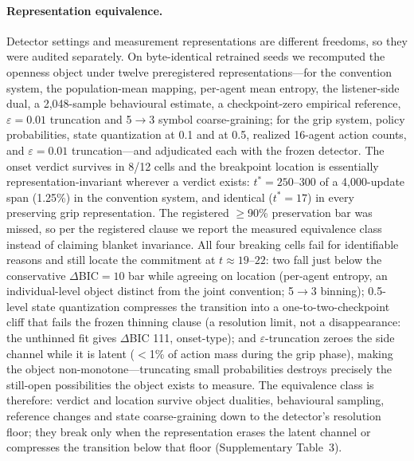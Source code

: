 \documentclass[11pt]{article}
\begin{document}
\paragraph{Representation equivalence.}
Detector settings and measurement representations are different
freedoms, so they were audited separately. On byte-identical retrained
seeds we recomputed the openness object under twelve preregistered
representations---for the convention system, the population-mean
mapping, per-agent mean entropy, the listener-side dual, a
2{,}048-sample behavioural estimate, a checkpoint-zero empirical
reference, $\varepsilon=0.01$ truncation and 5$\to$3 symbol
coarse-graining; for the grip system, policy probabilities, state
quantization at 0.1 and at 0.5, realized 16-agent action counts, and
$\varepsilon=0.01$ truncation---and adjudicated each with the frozen
detector. The onset verdict survives in 8/12 cells and the breakpoint
location is essentially representation-invariant wherever a verdict
exists: $t^{*}=250$--$300$ of a 4{,}000-update span (1.25\%) in the
convention system, and identical ($t^{*}=17$) in every preserving grip
representation. The registered $\geq$90\% preservation bar was missed,
so per the registered clause we report the measured equivalence class
instead of claiming blanket invariance. All four breaking cells fail
for identifiable reasons and still locate the commitment at
$t\approx19$--$22$: two fall just below the conservative
$\Delta$BIC$=10$ bar while agreeing on location (per-agent entropy,
an individual-level object distinct from the joint convention;
5$\to$3 binning); 0.5-level state quantization compresses the
transition into a one-to-two-checkpoint cliff that fails the frozen
thinning clause (a resolution limit, not a disappearance: the unthinned
fit gives $\Delta$BIC 111, onset-type); and $\varepsilon$-truncation
zeroes the side channel while it is latent ($<$1\% of action mass
during the grip phase), making the object non-monotone---truncating
small probabilities destroys precisely the still-open possibilities the
object exists to measure. The equivalence class is therefore:
verdict and location survive object dualities, behavioural sampling,
reference changes and state coarse-graining down to the detector's
resolution floor; they break only when the representation erases the
latent channel or compresses the transition below that floor
(Supplementary Table~3).
\end{document}
